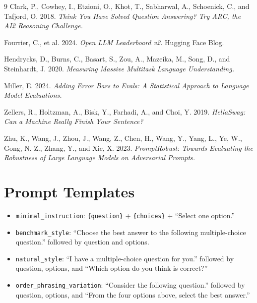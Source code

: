 \documentclass[11pt]{article}
\begin{document}
\begin{thebibliography}{9}
Clark, P., Cowhey, I., Etzioni, O., Khot, T., Sabharwal, A., Schoenick, C., and Tafjord, O. 2018.
\textit{Think You Have Solved Question Answering? Try ARC, the AI2 Reasoning Challenge.}

Fourrier, C., et al. 2024.
\textit{Open LLM Leaderboard v2.} Hugging Face Blog.

Hendrycks, D., Burns, C., Basart, S., Zou, A., Mazeika, M., Song, D., and Steinhardt, J. 2020.
\textit{Measuring Massive Multitask Language Understanding.}

Miller, E. 2024.
\textit{Adding Error Bars to Evals: A Statistical Approach to Language Model Evaluations.}

Zellers, R., Holtzman, A., Bisk, Y., Farhadi, A., and Choi, Y. 2019.
\textit{HellaSwag: Can a Machine Really Finish Your Sentence?}

Zhu, K., Wang, J., Zhou, J., Wang, Z., Chen, H., Wang, Y., Yang, L., Ye, W., Gong, N. Z., Zhang, Y., and Xie, X. 2023.
\textit{PromptRobust: Towards Evaluating the Robustness of Large Language Models on Adversarial Prompts.}
\end{thebibliography}

\appendix

\section{Prompt Templates}

\begin{itemize}[leftmargin=*]
    \item \texttt{minimal\_instruction}: \verb|{question}| + \verb|{choices}| + ``Select one option.''
    \item \texttt{benchmark\_style}: ``Choose the best answer to the following multiple-choice question.'' followed by question and options.
    \item \texttt{natural\_style}: ``I have a multiple-choice question for you.'' followed by question, options, and ``Which option do you think is correct?''
    \item \texttt{order\_phrasing\_variation}: ``Consider the following question.'' followed by question, options, and ``From the four options above, select the best answer.''
\end{itemize}
\end{document}
